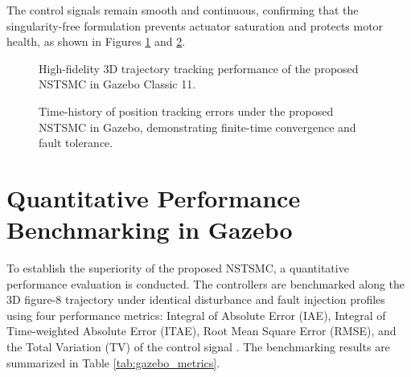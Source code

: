 The control signals remain smooth and continuous, confirming that the singularity-free formulation prevents actuator saturation and protects motor health, as shown in Figures \ref{fig:gazebo_nst_tracking} and \ref{fig:gazebo_nst_errors}.

\begin{figure}[htbp]
\centering
{}
\caption{High-fidelity 3D trajectory tracking performance of the proposed NSTSMC in Gazebo Classic 11.}
\label{fig:gazebo_nst_tracking}
\end{figure}

\begin{figure}[htbp]
\centering
{}
\caption{Time-history of position tracking errors under the proposed NSTSMC in Gazebo, demonstrating finite-time convergence and fault tolerance.}
\label{fig:gazebo_nst_errors}
\end{figure}

\section{Quantitative Performance Benchmarking in Gazebo}
To establish the superiority of the proposed NSTSMC, a quantitative performance evaluation is conducted. The controllers are benchmarked along the 3D figure-8 trajectory under identical disturbance and fault injection profiles using four performance metrics: Integral of Absolute Error (IAE), Integral of Time-weighted Absolute Error (ITAE), Root Mean Square Error (RMSE), and the Total Variation (TV) of the control signal \cite{ref_92, ref_93}. The benchmarking results are summarized in Table \ref{tab:gazebo_metrics}.

